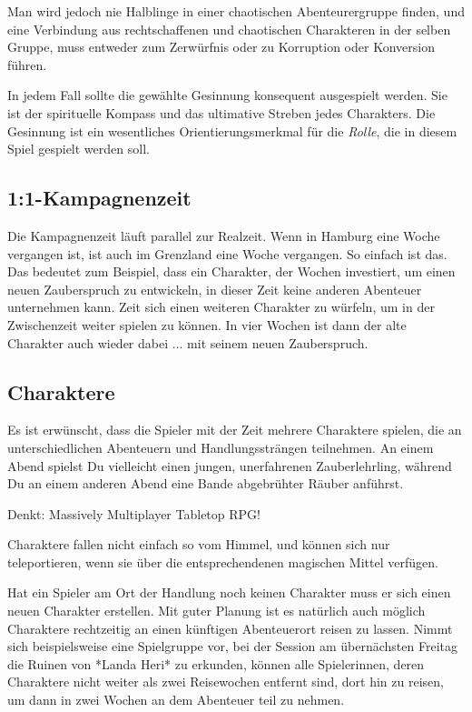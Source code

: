 \documentclass[11pt]{wbzine}
\begin{document}
\begin{multicols}{2}
    Man wird jedoch nie Halblinge in einer chaotischen
    Abenteurergruppe finden, und eine Verbindung aus rechtschaffenen
    und chaotischen Charakteren in der selben Gruppe, muss entweder zum 
    Zerwürfnis oder zu Korruption oder Konversion führen.

    In jedem Fall sollte die gewählte Gesinnung konsequent
    ausgespielt werden. Sie ist der spirituelle Kompass und das
    ultimative Streben jedes Charakters. Die Gesinnung ist ein
    wesentliches Orientierungsmerkmal für die \textit{Rolle}, die in
    diesem Spiel gespielt werden soll.

    \subsection{1:1-Kampagnenzeit}

    Die Kampagnenzeit läuft parallel zur Realzeit. Wenn in Hamburg
    eine Woche vergangen ist, ist auch im Grenzland eine Woche
    vergangen. So einfach ist das. Das bedeutet zum Beispiel, dass
    ein Charakter, der Wochen investiert, um einen neuen
    Zauberspruch zu entwickeln, in dieser Zeit keine anderen
    Abenteuer unternehmen kann. Zeit sich einen weiteren Charakter
    zu würfeln, um in der Zwischenzeit weiter spielen zu können. In
    vier Wochen ist dann der alte Charakter auch wieder dabei ...
    mit seinem neuen Zauberspruch.

    \subsection{Charaktere}

    Es ist erwünscht, dass die Spieler mit der Zeit mehrere
    Charaktere spielen, die an unterschiedlichen Abenteuern und
    Handlungssträngen teilnehmen. An einem Abend spielst Du
    vielleicht einen jungen, unerfahrenen Zauberlehrling, während Du
    an einem anderen Abend eine Bande abgebrühter Räuber anführst.

    \begin{tcolorbox} 
         Denkt: Massively Multiplayer Tabletop RPG!  
    \end{tcolorbox}

    Charaktere fallen nicht einfach so vom Himmel, und können sich
    nur teleportieren, wenn sie über die entsprechendenen magischen
    Mittel verfügen.

    Hat ein Spieler am Ort der Handlung noch keinen Charakter muss
    er sich einen neuen Charakter erstellen. Mit guter Planung ist
    es natürlich auch möglich Charaktere rechtzeitig an einen
    künftigen Abenteuerort reisen zu lassen. Nimmt sich
    beispielsweise eine Spielgruppe vor, bei der Session am
    übernächsten Freitag die Ruinen von *Landa Heri* zu erkunden,
    können alle Spielerinnen, deren Charaktere nicht weiter als zwei
    Reisewochen entfernt sind, dort hin zu reisen, um dann in zwei
    Wochen an dem Abenteuer teil zu nehmen.


\end{multicols}
\end{document}
